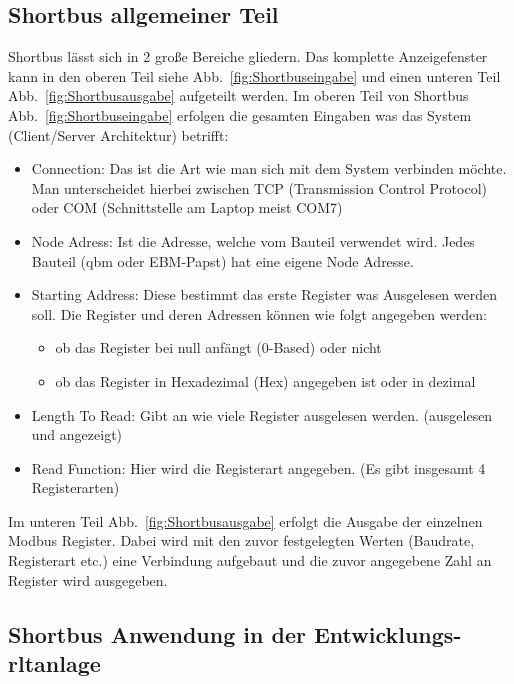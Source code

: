 \subsection{Shortbus allgemeiner Teil}
Shortbus lässt sich in 2 große Bereiche gliedern. Das komplette Anzeigefenster kann in den oberen Teil siehe Abb.~\ref{fig:Shortbuseingabe} und einen unteren Teil Abb.~\ref{fig:Shortbusausgabe} aufgeteilt werden.
Im oberen Teil von Shortbus Abb.~\ref{fig:Shortbuseingabe} erfolgen die gesamten Eingaben was das System (Client/Server Architektur) betrifft:
\begin{itemize}
	\item Connection: Das ist die Art wie man sich mit dem System verbinden möchte. Man unterscheidet hierbei zwischen TCP (Transmission Control Protocol) oder COM (Schnittstelle am Laptop meist COM7)
	
	\item Node Adress: Ist die Adresse, welche vom Bauteil verwendet wird. Jedes Bauteil (\zB \gls{qbm}  oder EBM-Papst) hat eine eigene Node Adresse.
	
	\item Starting Address: Diese bestimmt das erste Register was Ausgelesen werden soll. Die Register und deren Adressen können wie folgt angegeben werden:
		\begin{itemize}
			\item ob das Register bei null anfängt (0-Based) oder nicht
			\item ob das Register in Hexadezimal (Hex) angegeben ist oder in dezimal
		\end{itemize}
	\item Length To Read: Gibt an wie viele Register ausgelesen werden. (ausgelesen und angezeigt)
	\item Read Function: Hier wird die Registerart angegeben. (Es gibt insgesamt 4 Registerarten)
\end{itemize}

Im unteren Teil Abb.~\ref{fig:Shortbusausgabe} erfolgt die Ausgabe der einzelnen Modbus Register. Dabei wird mit den zuvor festgelegten Werten (Baudrate, Registerart etc.) eine Verbindung aufgebaut und die zuvor angegebene Zahl an Register wird ausgegeben. 


  

\subsection{Shortbus Anwendung in der Entwicklungs- \ac{rltanlage}}

